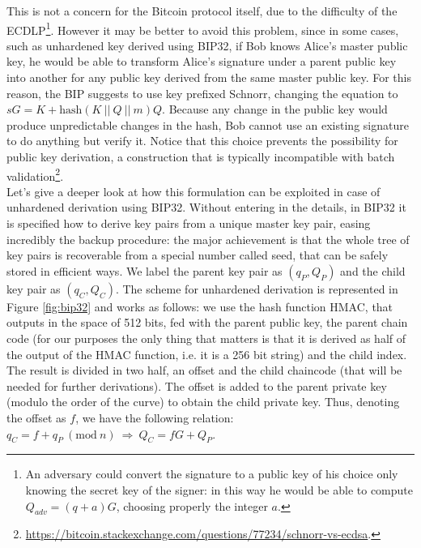 This is not a concern for the Bitcoin protocol itself, due to the difficulty of the ECDLP\footnote{An adversary could convert the signature to a public key of his choice only knowing the secret key of the signer: in this way he would be able to compute $Q_{adv} = (q + a)G$, choosing properly the integer $a$.}. However it may be better to avoid this problem, since in some cases, such as unhardened key derived using BIP32, if Bob knows Alice's master public key, he would be able to transform Alice's signature under a parent public key into another for any public key derived from the same master public key. For this reason, the BIP suggests to use key prefixed Schnorr, changing the equation to $sG = K + \text{hash}(K \ || \ Q \ || \ m)Q$. Because any change in the public key would produce unpredictable changes in the hash, Bob cannot use an existing signature to do anything but verify it. Notice that this choice prevents the possibility for public key derivation, a construction that is typically incompatible with batch validation\footnote{\url{https://bitcoin.stackexchange.com/questions/77234/schnorr-vs-ecdsa}.}.
\\
Let's give a deeper look at how this formulation can be exploited in case of unhardened derivation using BIP32. Without entering in the details, in BIP32 it is specified how to derive key pairs from a unique master key pair, easing incredibly the backup procedure: the major achievement is that the whole tree of key pairs is recoverable from a special number called seed, that can be safely stored in efficient ways. We label the parent key pair as $(q_P, Q_P)$ and the child key pair as $(q_C, Q_C)$. The scheme for unhardened derivation is represented in Figure \ref{fig:bip32} and works as follows: we use the hash function HMAC, that outputs in the space of 512 bits, fed with the parent public key, the parent chain code (for our purposes the only thing that matters is that it is derived as half of the output of the HMAC function, i.e. it is a 256 bit string) and the child index. The result is divided in two half, an offset and the child chaincode (that will be needed for further derivations). The offset is added to the parent private key (modulo the order of the curve) to obtain the child private key. Thus, denoting the offset as $f$, we have the following relation: $q_C = f + q_P \ (\text{mod} \ n) \ \Longrightarrow \ Q_C = fG + Q_P$.

